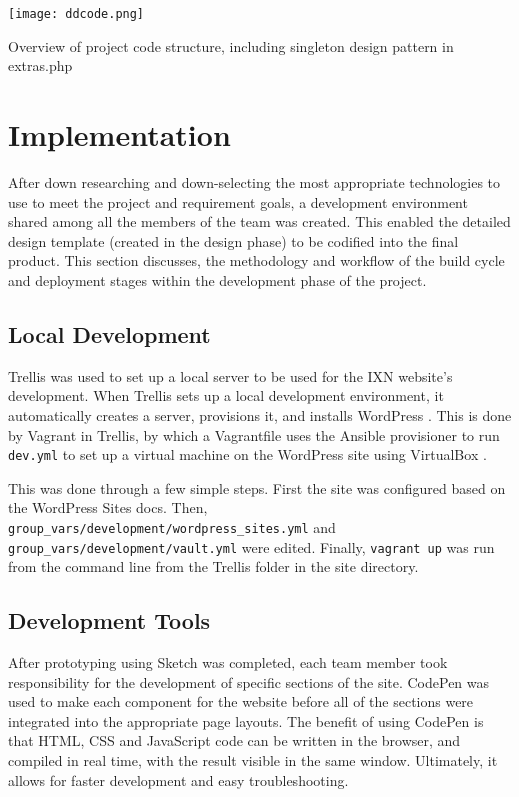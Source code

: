 \documentclass[fontsize=11pt]{extarticle}
\numberwithin{figure}{section} %
\begin{document}
\begin{table}[H]
\centering
\texttt{[image: ddcode.png]}
\caption{Overview of project code structure, including singleton design pattern in extras.php}
\label{ddcode}
\end{table}

\newpage

\hypertarget{implementation}{%
\section{Implementation}\label{implementation}}

After down researching and down-selecting the most appropriate
technologies to use to meet the project and requirement goals, a
development environment shared among all the members of the team was
created. This enabled the detailed design template (created in the
design phase) to be codified into the final product. This section
discusses, the methodology and workflow of the build cycle and
deployment stages within the development phase of the project.

\hypertarget{local-development}{%
\subsection{Local Development}\label{local-development}}

Trellis was used to set up a local server to be used for the IXN
website's development. When Trellis sets up a local development
environment, it automatically creates a server, provisions it, and
installs WordPress \cite{p21}. This is done by Vagrant in Trellis, by
which a Vagrantfile uses the Ansible provisioner to run \texttt{dev.yml}
to set up a virtual machine on the WordPress site using VirtualBox
\cite{p22} .

This was done through a few simple steps. First the site was configured
based on the WordPress Sites docs. Then,
\texttt{group\_vars/development/wordpress\_sites.yml} and
\texttt{group\_vars/development/vault.yml} were edited. Finally,
\texttt{vagrant\ up} was run from the command line from the Trellis
folder in the site directory.

\hypertarget{development-tools}{%
\subsection{Development Tools}\label{development-tools}}

After prototyping using Sketch was completed, each team member took
responsibility for the development of specific sections of the site.
CodePen was used to make each component for the website before all of
the sections were integrated into the appropriate page layouts. The
benefit of using CodePen is that HTML, CSS and JavaScript code can be
written in the browser, and compiled in real time, with the result
visible in the same window. \cite{p19} Ultimately, it allows for faster
development and easy troubleshooting.
\end{document}
